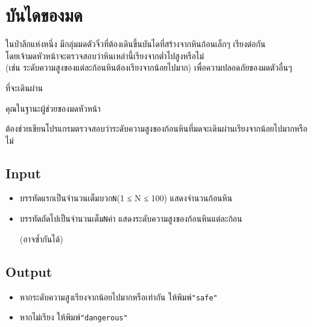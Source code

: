 \documentclass{article}
\begin{document}
\section*{บันไดของมด}

ในป่าลึกแห่งหนึ่ง มีกลุ่มมดตัวจิ๋วที่ต้องเดินขึ้นบันไดที่สร้างจากหินก้อนเล็กๆ เรียงต่อกัน\\

โดยเจ้ามดหัวหน้าจะตรวจสอบว่าหินเหล่านี้เรียงจากต่ำไปสูงหรือไม่\\

(เช่น ระดับความสูงของแต่ละก้อนหินต้องเรียงจากน้อยไปมาก) เพื่อความปลอดภัยของมดตัวอื่นๆ

ที่จะเดินผ่าน



คุณในฐานะผู้ช่วยของมดหัวหน้า

ต้องช่วยเขียนโปรแกรมตรวจสอบว่าระดับความสูงของก้อนหินที่มดจะเดินผ่านเรียงจากน้อยไปมากหรือไม่



\subsection*{Input}
\begin{itemize}

\item

  บรรทัดแรกเป็นจำนวนเต็มบวก\texttt{N}(1 ≤ N ≤ 100) แสดงจำนวนก้อนหิน

\item

  บรรทัดถัดไปเป็นจำนวนเต็ม\texttt{N}ค่า แสดงระดับความสูงของก้อนหินแต่ละก้อน

  (อาจซ้ำกันได้)

\end{itemize}



\subsection*{Output}
\begin{itemize}

\item

  หากระดับความสูงเรียงจากน้อยไปมากหรือเท่ากัน ให้พิมพ์\texttt{"safe"}

\item

  หากไม่เรียง ให้พิมพ์\texttt{"dangerous"}

\end{itemize}
\end{document}
